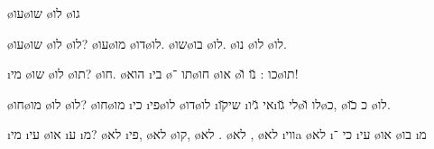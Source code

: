  \o{עו}\o{שו} \o{לו}
 \o{גו}

 \o{עו}\o{שו} \o{לו} \o{לו}?
 \o{עו}\o{מו}   \o{דו}\o{לו}.
 \o{שו}\o{בו}   \o{לו}.
\o{נו} \o{לו} \o{לו}.

\i{מי} \o{שו}  \o{לו} \o{תו}?
\gnuva {}  \o{חו}.
\o{הוא} \i{בי} \o{תו}  ־\o{חו}
\o{או} \o{כו} : \u{נו} \u{ו}\o{תו}!

 \o{חו}\o{מו} \o{לו} \o{לו}?
 \o{חו}\o{מו} \i{כי} \i{פי}\o{לו} \o{דו}\o{לו}
\i{שי}\u{קו} \i{אי} \u{ג׳ו}\i{לי} \u{גו}\o{לו}
\u{ו}\o{כ}, \o{כ} \u{כו} \o{לו}.

\i{מי} \i{עי} \o{או} \i{ע}  \i{מ}?
\o{לא} \i{פי}, \o{לא} \o{קו}, \o{לא} .
\o{לא} , \o{לא} \i{ווי}a \o{לא} 
\i{כי} ־ 
\i{עי} \o{או} \o{בו} \i{מ}

